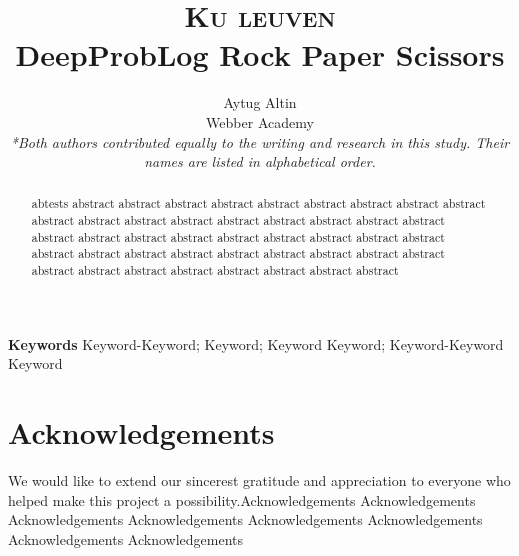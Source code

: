 \documentclass[10pt,letterpaper]{article}
\title{
		\usefont{OT1}{bch}{b}{n}
		\normalfont \normalsize \textsc{Ku leuven} \\ [10pt]
		\huge DeepProbLog Rock Paper Scissors\\
}
\author[0]{Aytug Altin \\
		Webber Academy \\
        \textit{*Both authors contributed equally to the writing and research in this study. Their names are listed in alphabetical order.}}
\begin{document}
\maketitle

\begin{abstract}
	abtests abstract abstract abstract abstract abstract abstract abstract abstract abstract abstract abstract abstract abstract abstract abstract abstract abstract abstract abstract abstract abstract abstract abstract abstract abstract abstract abstract abstract abstract abstract abstract abstract abstract abstract abstract abstract abstract abstract abstract abstract abstract abstract abstract abstract
\end{abstract}
{\textbf{Keywords}
Keyword-Keyword; Keyword; Keyword Keyword; Keyword-Keyword Keyword}










\section*{Acknowledgements}
We would like to extend our sincerest gratitude and appreciation to everyone who helped make this project a possibility.Acknowledgements Acknowledgements Acknowledgements Acknowledgements Acknowledgements Acknowledgements Acknowledgements Acknowledgements


{}
\end{document}
